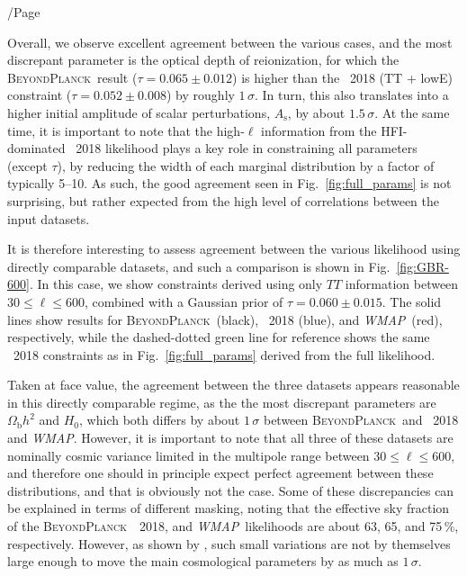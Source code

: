 /Page\documentclass[twocolumn]{aa}
\def\WMAP{\textit{WMAP}}
\newcommand{\BP}{\textsc{BeyondPlanck}}
\begin{document}
Overall, we observe excellent agreement between the various cases, and
the most discrepant parameter is the optical depth of reionization,
for which the \BP\ result ($\tau=0.065\pm0.012$) is higher than the
\Planck\ 2018 (TT + lowE) constraint ($\tau=0.052\pm0.008$) by roughly
$1\,\sigma$. In turn, this also translates into a higher initial
amplitude of scalar perturbations, $A_{\mathrm{s}}$, by about
$1.5\,\sigma$. At the same time, it is important to note that the
high-$\ell$ information from the HFI-dominated \Planck\ 2018
likelihood plays a key role in constraining all parameters (except
$\tau$), by reducing the width of each marginal distribution by a
factor of typically 5--10. As such, the good agreement seen in
Fig.~\ref{fig:full_params} is not surprising, but rather expected from
the high level of correlations between the input datasets.

It is therefore interesting to assess agreement between the various
likelihood using directly comparable datasets, and such a comparison
is shown in Fig.~\ref{fig:GBR-600}. In this case, we show constraints
derived using only $TT$ information between $30\le\ell\le600$,
combined with a Gaussian prior of $\tau=0.060\pm0.015$. The solid
lines show results for \BP\ (black), \Planck\ 2018 (blue), and
\WMAP\ (red), respectively, while the dashed-dotted green line for
reference shows the same \Planck\ 2018 constraints as in
Fig.~\ref{fig:full_params} derived from the full likelihood.

Taken at face value, the agreement between the three datasets appears
reasonable in this directly comparable regime, as the the most
discrepant parameters are $\Omega_{\mathrm{b}}h^2$ and $H_0$, which
both differs by about $1\,\sigma$ between \BP\ and \Planck\ 2018 and
\WMAP. However, it is important to note that all three of these datasets
are nominally cosmic variance limited in the multipole range between
$30\le\ell\le 600$, and therefore one should in principle expect
perfect agreement between these distributions, and that is obviously
not the case. Some of these discrepancies can be explained in terms of
different masking, noting that the effective sky fraction of the \BP\,
\Planck\ 2018, and \WMAP\ likelihoods are about 63, 65, and 75\,\%,
respectively. However, as shown by \citet{planck2016-l05}, such small
variations are not by themselves large enough to move the main
cosmological parameters by as much as $1\,\sigma$.
\end{document}

